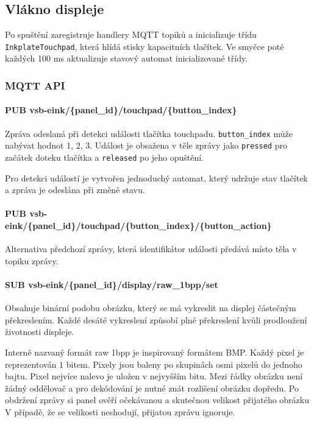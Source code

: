 \subsection{Vlákno displeje}
Po spuštění zaregistruje handlery MQTT topiků a inicializuje třídu \lstinline|InkplateTouchpad|, která hlídá stisky kapacitních tlačítek. Ve smyčce poté každých 100 ms aktualizuje stavový automat inicializované třídy.

\subsubsection*{MQTT API}
\paragraph*{PUB vsb-eink/\{panel\_id\}/touchpad/\{button\_index\}}
Zpráva odeslaná při detekci události tlačítka touchpadu. \lstinline{button_index} může nabývat hodnot 1, 2, 3. Událost je obsažena v těle zprávy jako \verb|pressed| pro začátek doteku tlačítka a \verb|released| po jeho opuštění.

Pro detekci událostí je vytvořen jednoduchý automat, který udržuje stav tlačítek a zpráva je odeslána při změně stavu.

\paragraph*{PUB vsb-eink/\{panel\_id\}/touchpad/\{button\_index\}/\{button\_action\}}
Alternativa předchozí zprávy, která identifikátor události předává místo těla v topiku zprávy.

\paragraph*{SUB vsb-eink/\{panel\_id\}/display/raw\_1bpp/set}
Obsahuje binární podobu obrázku, který se má vykreslit na displej částečným překreslením. Každé desáté vykreslení způsobí plné překreslení kvůli prodloužení životnosti displeje.

Interně nazvaný formát raw 1bpp je inspirovaný formátem BMP. Každý pixel je reprezentován 1 bitem. Pixely jsou baleny po skupinách osmi pixelů do jednoho bajtu. Pixel nejvíce nalevo je uložen v nejvyšším bitu. Mezi řádky obrázku není žádný oddělovač a pro dekódování je nutné znát rozlišení obrázku dopředu. Po obdržení zprávy si panel ověří očekávanou a skutečnou velikost přijatého obrázku V případě, že se velikosti neshodují, přijatou zprávu ignoruje.

